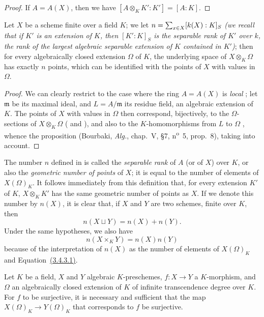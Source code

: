 \begin{proof}
\label{proof-I.6.4.6}
If $A=A(X)$, then we have $[A\otimes_K K':K']=[A:K]$.
\end{proof}

\begin{corollary}[6.4.7]
\label{I.6.4.7}
Let $X$ be a scheme finite over a field $K$;
we let $n=\sum_{x\in X}[k(X):K]_S$ \emph{(we recall that if $K'$ is an extension of $K$, then $[K':K]_S$ is the \emph{separable rank} of $K'$ over $k$, the rank of the largest algebraic separable extension of $K$ contained in $K'$)};
then
for every algebraically closed extension $\Omega$ of $K$, the underlying space of $X\otimes_K\Omega$ has exactly $n$ points, which can be identified with the points of $X$ with values in $\Omega$.
\end{corollary}

\begin{proof}
\label{proof-I.6.4.7}
We can clearly restrict to the case where the ring $A=A(X)$ is \emph{local} ;
let $\mathfrak{m}$ be its maximal ideal, and $L=A/\mathfrak{m}$ its residue field, an algebraic extension of $K$.
The points of $X$ with values in $\Omega$ then correspond, bijectively, to the $\Omega$-sections of $X\otimes_K\Omega$ ( and ), and also to the $K$-homomorphisms from $L$ to $\Omega$ , whence the proposition (Bourbaki, \emph{Alg.}, chap.~V, §7, n\textsuperscript{o}~5, prop.~8), taking  into account.
\end{proof}

\begin{env}[6.4.8]
\label{I.6.4.8}
The number $n$ defined in  is called the \emph{separable rank} of $A$ (or of $X$) over $K$, or also the \emph{geometric number of points} of $X$;
it is equal to the number of elements of $X(\Omega)_K$.
It follows immediately from this definition that, for every extension $K'$ of $K$, $X\otimes_K K'$ has the same geometric number of points as $X$.
If we denote this number by $n(X)$, it is clear that, if $X$ and $Y$ are two schemes, finite over $K$, then
\[
    n(X\sqcup Y)=n(X)+n(Y).\tag{6.4.8.1}
\]
Under the same hypotheses, we also have
\[
    n(X\times_K Y)=n(X)n(Y)\tag{6.4.8.2}
\]
because of the interpretation of $n(X)$ as the number of elements of $X(\Omega)_K$ and Equation~\hyperref[1.3.4.3]{(3.4.3.1)}.
\end{env}

\begin{proposition}[6.4.9]
\label{I.6.4.9}
Let $K$ be a field, $X$ and $Y$ algebraic $K$-preschemes, $f:X\to Y$ a $K$-morphism, and $\Omega$ an algebraically closed extension of $K$ of infinite transcendence degree over $K$.
For $f$ to be surjective, it is necessary and sufficient that the map $X(\Omega)_K\to Y(\Omega)_K$ that corresponds to $f$  be surjective.
\end{proposition}

